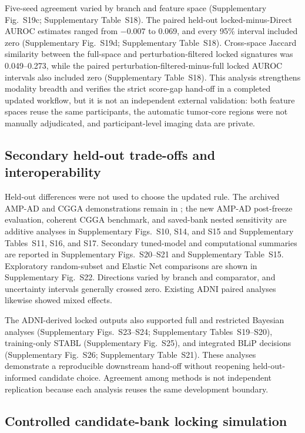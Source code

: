 Five-seed agreement varied by branch and feature space (Supplementary Fig.~S19c; Supplementary Table~S18). The paired held-out locked-minus-Direct AUROC estimates ranged from \(-0.007\) to 0.069, and every 95\% interval included zero (Supplementary Fig.~S19d; Supplementary Table~S18). Cross-space Jaccard similarity between the full-space and perturbation-filtered locked signatures was 0.049--0.273, while the paired perturbation-filtered-minus-full locked AUROC intervals also included zero (Supplementary Table~S18). This analysis strengthens modality breadth and verifies the strict score-gap hand-off in a completed updated workflow, but it is not an independent external validation: both feature spaces reuse the same participants, the automatic tumor-core regions were not manually adjudicated, and participant-level imaging data are private.

\subsection{Secondary held-out trade-offs and interoperability}

Held-out differences were not used to choose the updated rule. The archived AMP-AD and CGGA demonstrations remain in ; the new AMP-AD post-freeze evaluation, coherent CGGA benchmark, and saved-bank nested sensitivity are additive analyses in Supplementary Figs.~S10, S14, and S15 and Supplementary Tables~S11, S16, and S17. Secondary tuned-model and computational summaries are reported in Supplementary Figs.~S20--S21 and Supplementary Table~S15. Exploratory random-subset and Elastic Net comparisons are shown in Supplementary Fig.~S22. Directions varied by branch and comparator, and uncertainty intervals generally crossed zero. Existing ADNI paired analyses likewise showed mixed effects.

The ADNI-derived locked outputs also supported full and restricted Bayesian analyses (Supplementary Figs.~S23--S24; Supplementary Tables~S19--S20), training-only STABL (Supplementary Fig.~S25), and integrated BLiP decisions (Supplementary Fig.~S26; Supplementary Table~S21). These analyses demonstrate a reproducible downstream hand-off without reopening held-out-informed candidate choice. Agreement among methods is not independent replication because each analysis reuses the same development boundary.

\subsection{Controlled candidate-bank locking simulation}

